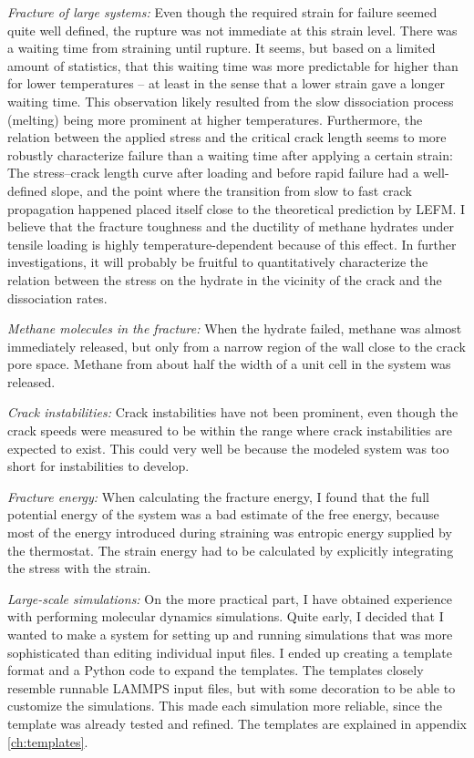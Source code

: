 \textit{Fracture of large systems:} Even though the required strain for failure seemed quite well defined, the rupture was not immediate at this strain level. There was a waiting time from straining until rupture. It seems, but based on a limited amount of statistics, that this waiting time was more predictable for higher than for lower temperatures -- at least in the sense that a lower strain gave a longer waiting time. This observation likely resulted from the slow dissociation process (melting) being more prominent at higher temperatures.  Furthermore, the relation between the applied stress and the critical crack length seems to more robustly characterize failure than a waiting time after applying a certain strain: The stress--crack length curve after loading and before rapid failure had a well-defined slope, and the point where the transition from slow to fast crack propagation happened placed itself close to the theoretical prediction by LEFM. I believe that the fracture toughness and the ductility of methane hydrates under tensile loading is highly temperature-dependent because of this effect. In further investigations, it will probably be fruitful to quantitatively characterize the relation between the stress on the hydrate in the vicinity of the crack and the dissociation rates. 

\textit{Methane molecules in the fracture:} When the hydrate failed, methane was almost immediately released, but only from a narrow region of the wall close to the crack pore space. Methane from about half the width of a unit cell in the system was released.

\textit{Crack instabilities:} Crack instabilities have not been prominent, even though the crack speeds were measured to be within the range where crack instabilities are expected to exist. This could very well be because the modeled system was too short for instabilities to develop.

\textit{Fracture energy:} When calculating the fracture energy, I found that the full potential energy of the system was a bad estimate of the free energy, because most of the energy introduced during straining was entropic energy supplied by the thermostat. The strain energy had to be calculated by explicitly integrating the stress with the strain. 

\textit{Large-scale simulations:} On the more practical part, I have obtained experience with performing molecular dynamics simulations. Quite early, I decided that I wanted to make a system for setting up and running simulations that was more sophisticated than editing individual input files. I ended up creating a template format and a Python code to expand the templates. The templates closely resemble runnable LAMMPS input files, but with some decoration to be able to customize the simulations. This made each simulation more reliable, since the template was already tested and refined. The templates are explained in appendix \ref{ch:templates}.


